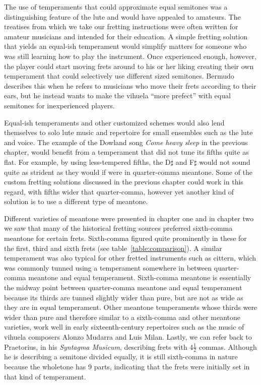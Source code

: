 The use of temperaments that could approximate equal semitones was a distinguishing
feature of the lute and would have appealed to amateurs. The treatises from which we
take our fretting instructions were often written for amateur musicians and intended
for their education. A simple fretting solution that yields an equal-ish temperament
would simplify matters for someone who was still learning how to play the instrument.
Once experienced enough, however, the player could start moving frets around to his or
her liking creating their own temperament that could selectively use different sized
semitones. Bermudo describes this when he refers to musicians who move their
frets according to their ears, but he instead wants to make the vihuela ``more
prefect'' with equal semitones for inexperienced players.\autocite[78]{DE:1}

Equal-ish temperaments and other customized schemes would also lend themselves to solo
lute music and repertoire for small ensembles such as the lute and voice. The example
of the Dowland song \textit{Come heavy sleep} in the previous chapter, would benefit
from a temperament that did not tune its fifths quite as flat.  For example, by using
less-tempered fifths, the D$\sharp$ and F$\sharp$ would not sound quite as strident as
they would if were in quarter-comma meantone. Some of the custom fretting solutions
discussed in the previous chapter could work in this regard, with fifths wider that
quarter-comma, however yet another kind of solution is to use a different type of
meantone.

Different varieties of meantone were presented in chapter one and in chapter two we saw
that many of the historical fretting sources preferred sixth-comma meantone for certain
frets.   Sixth-comma figured quite prominently in these for the first, third and sixth
frets (see table~\ref{table:comparison}). A similar temperament was also typical for
other fretted instruments such as cittern, which was commonly tunned using a
temperament somewhere in between quarter-comma meantone and equal temperament.
\autocite[12]{PF:1}  Sixth-comma meantone is essentially the midway point between
quarter-comma meantone and equal temperament because its thirds are tunned slightly
wider than pure, but are not as wide as they are in equal temperament. Other meantone
temperaments whose thirds were wider than pure and therefore similar to a sixth-comma
and other meantone varieties, work well in early sixteenth-century repertoires such as
the music of vihuela composers Alonzo Mudarra and Luis Milan.\autocite[56]{WH:1}
Lastly, we can refer back to Praetorius, in his \textit{Syntagma Musicum}, describing
frets with 4$ \frac{1}{2} $ commas.\autocite[68]{MP:1} Although he is describing a
semitone divided equally, it is still sixth-comma in nature because the wholetone has 9
parts, indicating that the frets were initially set in that kind of temperament.


